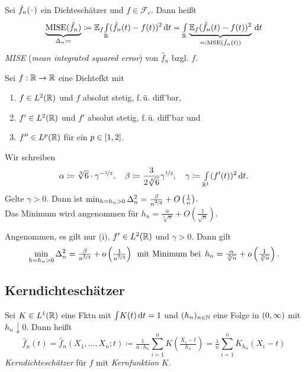 \documentclass{cheat-sheet}
\newcommand{\E}{\mathbb{E}} %
\DeclareMathOperator{\MSE}{MSE} %
\DeclareMathOperator{\MISE}{MISE} %
\begin{document}
\begin{defn}
  Sei $\hat{f}_n(\text{--})$ ein Dichteschätzer und $f \in \mathcal{F}_c$.
  Dann heißt
  \[
    \underbrace{\MISE(\hat{f}_n)}_{\Delta_n \coloneqq} \coloneqq
    \E_f \Int{\R}{}{(\hat{f}_n(t) - f(t))^2}{t} =
    \Int{\R}{}{\underbrace{\E_f (\hat{f}_n(t) - f(t))^2}_{=: \MSE(\hat{f}_n(t))}}{t}
  \]
  \emph{MISE} (\textit{mean integrated squared error}) von $\hat{f}_n$ bzgl. $f$.
\end{defn}

\begin{satz}
  Sei $f : \mathbb{R} \to \mathbb{R}$ eine Dichtefkt mit
  \begin{enumerate}[label=(\roman*), itemindent=10pt]
    \item $f \in L^2(\mathbb{R})$ und $f$ absolut stetig, \dh{} f.\,ü. diff'bar,
    \item $f' \in L^2(\mathbb{R})$ und $f'$ absolut stetig, \dh{} f.\,ü. diff'bar und
    \item $f'' \in L^p(\mathbb{R})$ für ein $p \in \left[ 1, 2 \right]$.
  \end{enumerate}
  Wir schreiben
  \[
    \alpha \coloneqq \sqrt[3]{6} \cdot \gamma^{- \nicefrac{1}{3}}, \quad
    \beta \coloneqq \frac{3}{2 \sqrt[3]{6}} \gamma^{\nicefrac{1}{3}}, \quad
    \gamma \coloneqq {\textstyle \int\limits_{\mathbb{R}^1}^{}} (f'(t))^2 \,\mathrm{d} t.
  \]
  Gelte $\gamma > 0$.
  Dann ist \enspace
  $\min_{h = h_n > 0} \Delta_n^2 = \tfrac{\beta}{n^{\nicefrac{2}{3}}} + O \left( \tfrac{1}{n} \right)$. \\
  Das Minimum wird angenommen für \enspace
  $h_n = \tfrac{\alpha}{\sqrt[3]{n}} + O \left( \tfrac{1}{\sqrt{n}} \right)$.

  Angenommen, es gilt nur (i), $f' \in L^2(\mathbb{R})$ und $\gamma > 0$.
  Dann gilt
  \[
    \min_{h = h_n > 0} \Delta_n^2 = \tfrac{\beta}{n^{\nicefrac{2}{3}}} + o \left( \tfrac{1}{n^{\nicefrac{2}{3}}} \right)
    \enspace \text{mit Minimum bei} \enspace
    h_n = \tfrac{\alpha}{\sqrt[3]{n}} + o \left( \tfrac{1}{\sqrt[3]{n}} \right).
  \]
\end{satz}

\begin{samepage}

\subsection{Kerndichteschätzer}

\begin{defn}
  Sei $K \in L^1(\mathbb{R})$ eine Fktn mit ${\textstyle \int} K(t) \,\mathrm{d} t = 1$ und $(h_n)_{n \in \mathbb{N}}$ eine Folge in $\left( 0, \infty \right)$ mit $h_n \downarrow 0$.
  Dann heißt
  \[
    \hat{f}_n(t) =
    \hat{f}_n(X_1, \ldots, X_n; t) \coloneqq
    \tfrac{1}{n \cdot h_n} \sum_{i=1}^n K \left( \tfrac{X_i - t}{h_n} \right) =
    \tfrac{1}{n} \sum_{i=1}^n K_{h_n} (X_i - t)
  \]
  \emph{Kerndichteschätzer} für $f$ mit \textit{Kernfunktion} $K$.
\end{defn}

\end{samepage}
\end{document}
